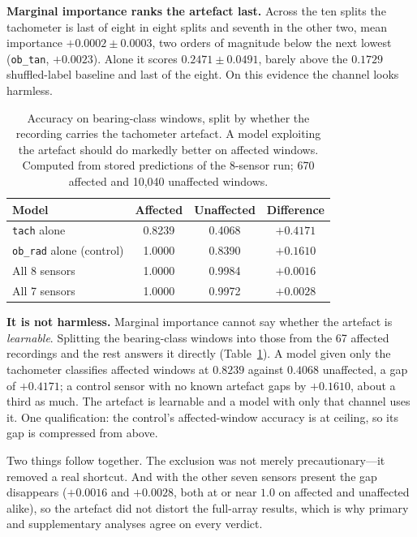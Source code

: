 \documentclass[conference]{IEEEtran}
\begin{document}
\textbf{Marginal importance ranks the artefact last.} Across the ten splits the
tachometer is last of eight in eight splits and seventh in the other two, mean
importance $+0.0002 \pm 0.0003$, two orders of magnitude below the next lowest
(\texttt{ob\_tan}, $+0.0023$). Alone it scores $0.2471 \pm 0.0491$, barely above
the $0.1729$ shuffled-label baseline and last of the eight. On this evidence
the channel looks harmless.

\begin{table}[t]
\centering
\caption{Accuracy on bearing-class windows, split by whether the recording
carries the tachometer artefact. A model exploiting the artefact should do
markedly better on affected windows. Computed from stored predictions of the
8-sensor run; 670 affected and 10{,}040 unaffected windows.}
\label{tab:tach}
\footnotesize
\setlength{\tabcolsep}{4pt}
\begin{tabular}{lccc}
\toprule
Model & Affected & Unaffected & Difference \\
\midrule
\texttt{tach} alone              & 0.8239 & 0.4068 & $+0.4171$ \\
\texttt{ob\_rad} alone (control) & 1.0000 & 0.8390 & $+0.1610$ \\
All 8 sensors                    & 1.0000 & 0.9984 & $+0.0016$ \\
All 7 sensors                    & 1.0000 & 0.9972 & $+0.0028$ \\
\bottomrule
\end{tabular}
\end{table}

\textbf{It is not harmless.} Marginal importance cannot say whether the
artefact is \emph{learnable}. Splitting the bearing-class windows into those
from the 67 affected recordings and the rest answers it directly
(Table~\ref{tab:tach}). A model given only the tachometer classifies affected
windows at $0.8239$ against $0.4068$ unaffected, a gap of $+0.4171$; a control
sensor with no known artefact gaps by $+0.1610$, about a third as much. The
artefact is learnable and a model with only that channel uses it. One
qualification: the control's affected-window accuracy is at ceiling, so its gap
is compressed from above.

Two things follow together. The exclusion was not merely precautionary---it
removed a real shortcut. And with the other seven sensors present the gap
disappears ($+0.0016$ and $+0.0028$, both at or near $1.0$ on affected and
unaffected alike), so the artefact did not distort the full-array results,
which is why primary and supplementary analyses agree on every verdict.
\end{document}
